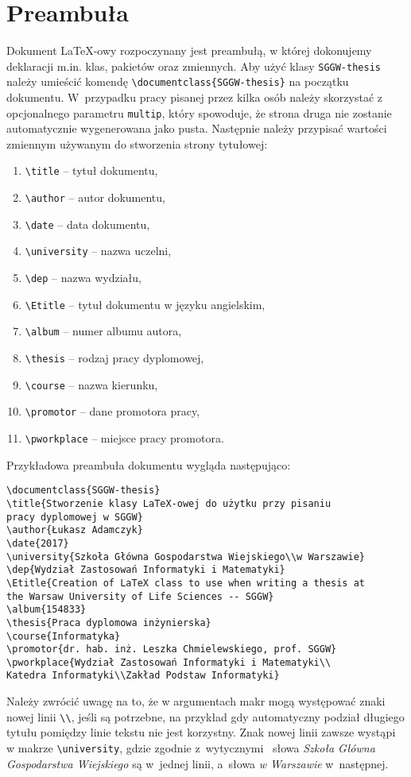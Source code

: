 \documentclass{SGGW-thesis}
\begin{document}
\section{Preambuła}
Dokument \LaTeX-owy rozpoczynany jest preambułą, w której dokonujemy deklaracji m.in. klas, pakietów oraz zmiennych. Aby użyć klasy {\tt SGGW-thesis} należy umieścić komendę \verb|\documentclass{SGGW-thesis}| na początku dokumentu. W~przypadku pracy pisanej przez kilka osób należy skorzystać z opcjonalnego parametru \verb|multip|, który spowoduje, że strona druga nie zostanie automatycznie wygenerowana jako pusta.  Następnie należy przypisać wartości zmiennym używanym do stworzenia strony tytułowej:
\begin{enumerate}[label=\alph*.]
\item{\verb|\title| -- tytuł dokumentu,}
\item{\verb|\author| -- autor dokumentu,}
\item{\verb|\date|  -- data dokumentu,}
\item{\verb|\university| -- nazwa uczelni,}
\item{\verb|\dep| -- nazwa wydziału,}
\item{\verb|\Etitle| -- tytuł dokumentu w języku angielskim,}
\item{\verb|\album| -- numer albumu autora,}
\item{\verb|\thesis| -- rodzaj pracy dyplomowej,}
\item{\verb|\course| -- nazwa kierunku,}
\item{\verb|\promotor| -- dane promotora pracy,}
\item{\verb|\pworkplace| -- miejsce pracy promotora.}
\end{enumerate}
Przykładowa preambuła dokumentu wygląda następująco:
\begin{verbatim}
\documentclass{SGGW-thesis}
\title{Stworzenie klasy LaTeX-owej do użytku przy pisaniu
pracy dyplomowej w SGGW}
\author{Łukasz Adamczyk}
\date{2017}
\university{Szkoła Główna Gospodarstwa Wiejskiego\\w Warszawie}
\dep{Wydział Zastosowań Informatyki i Matematyki}
\Etitle{Creation of LaTeX class to use when writing a thesis at
the Warsaw University of Life Sciences -- SGGW}
\album{154833}
\thesis{Praca dyplomowa inżynierska}
\course{Informatyka}
\promotor{dr. hab. inż. Leszka Chmielewskiego, prof. SGGW}
\pworkplace{Wydział Zastosowań Informatyki i Matematyki\\
Katedra Informatyki\\Zakład Podstaw Informatyki}
\end{verbatim}
Należy zwrócić uwagę na to, że w argumentach makr mogą występować znaki nowej linii \verb|\\|, jeśli są potrzebne, na przykład gdy automatyczny podział długiego tytułu pomiędzy linie tekstu nie jest korzystny. Znak nowej linii zawsze wystąpi w makrze \verb|\university|, gdzie zgodnie z~wytycznymi~\cite{wymagania} słowa {\em Szkoła Główna Gospodarstwa Wiejskiego} są w~jednej linii, a~słowa {\em w Warszawie} w~następnej.
\end{document}
